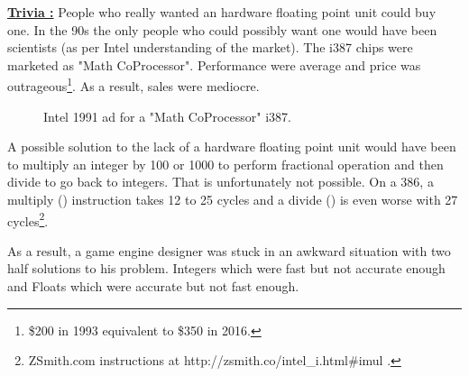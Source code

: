 \documentclass[book.tex]{subfiles}
\begin{document}
\textbf{\underline{Trivia :}} People who really wanted an hardware floating point unit could buy one. In the 90s the only people who could possibly want one would have been scientists (as per Intel understanding of the market). The i387 chips were marketed as "Math CoProcessor". Performance were average and price was outrageous\footnote{\$200 in 1993 equivalent to \$350 in 2016.}. As a result, sales were mediocre.\\
\begin{figure}[H]
\centering
  
  
\caption{Intel 1991 ad for a "Math CoProcessor" i387.}
\label{fig:fp_internals}
\end{figure}



\par
A possible solution to the lack of a hardware floating point unit would have been to multiply an integer by 100 or 1000 to perform fractional operation and then divide to go back to integers. That is unfortunately not possible. On a 386, a multiply () instruction takes 12 to 25 cycles and a divide () is even worse with 27 cycles\footnote{ZSmith.com instructions at http://zsmith.co/intel\_i.html\#imul .}.\\ 
\par
As a result, a game engine designer was stuck in an awkward situation with two half solutions to his problem. Integers which were fast but not accurate enough and Floats which were accurate but not fast enough.\\
\par
  
\end{document}
